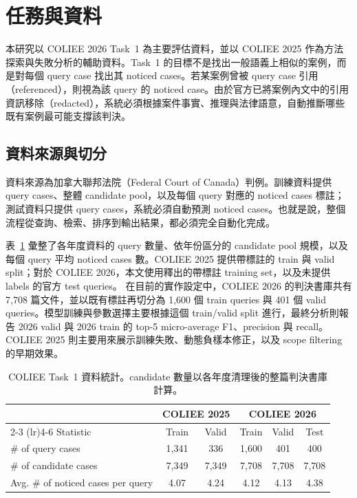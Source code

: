 \section{任務與資料}

本研究以 COLIEE 2026 Task~1 為主要評估資料，並以 COLIEE 2025 作為方法探索與失敗分析的輔助資料。Task~1 的目標不是找出一般語義上相似的案例，而是對每個 query case 找出其 noticed cases。若某案例曾被 query case 引用（referenced），則視為該 query 的 noticed case。由於官方已將案例內文中的引用資訊移除（redacted），系統必須根據案件事實、推理與法律語意，自動推斷哪些既有案例最可能支撐該判決。

\subsection{資料來源與切分}

資料來源為加拿大聯邦法院（Federal Court of Canada）判例。訓練資料提供 query cases、整體 candidate pool，以及每個 query 對應的 noticed cases 標註；測試資料只提供 query cases，系統必須自動預測 noticed cases。也就是說，整個流程從查詢、檢索、排序到輸出結果，都必須完全自動化完成。

表~\ref{tab:dataset-stats} 彙整了各年度資料的 query 數量、依年份區分的 candidate pool 規模，以及每個 query 平均 noticed cases 數。COLIEE 2025 提供帶標註的 train 與 valid split；對於 COLIEE 2026，本文使用釋出的帶標註 training set，以及未提供 labels 的官方 test queries。 在目前的實作設定中，COLIEE 2026 的判決書庫共有 7,708 篇文件，並以既有標註再切分為 1,600 個 train queries 與 401 個 valid queries。模型訓練與參數選擇主要根據這個 train/valid split 進行，最終分析則報告 2026 valid 與 2026 train 的 top-5 micro-average F1、precision 與 recall。COLIEE 2025 則主要用來展示訓練失敗、動態負樣本修正，以及 scope filtering 的早期效果。

\begin{table}[t]
\caption{COLIEE Task~1 資料統計。candidate 數量以各年度清理後的整篇判決書庫計算。}
\label{tab:dataset-stats}
\centering
\small
\setlength{\tabcolsep}{5pt}
\begin{tabular}{lccccc}
\toprule
 & \multicolumn{2}{c}{COLIEE 2025} & \multicolumn{3}{c}{COLIEE 2026} \\
\cmidrule(lr){2-3} \cmidrule(lr){4-6}
Statistic & Train & Valid & Train & Valid & Test \\
\midrule
\# of query cases & 1,341 & 336 & 1,600 & 401 & 400 \\
\# of candidate cases & 7,349 & 7,349 & 7,708 & 7,708 & 7,708 \\
Avg. \# of noticed cases per query & 4.07 & 4.24 & 4.12 & 4.13 & 4.38 \\
\bottomrule
\end{tabular}
\end{table}

